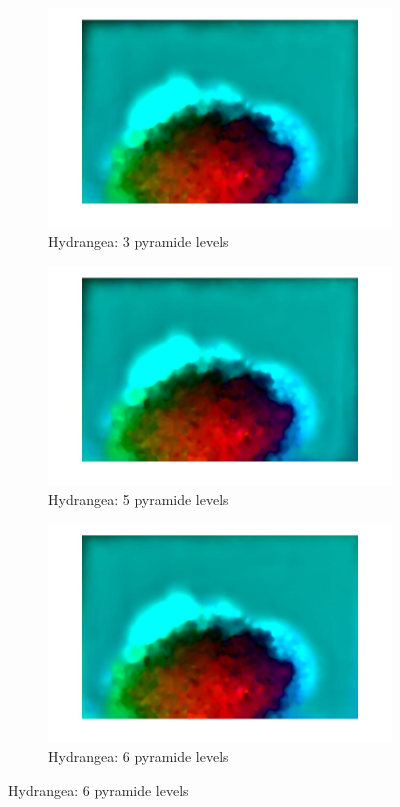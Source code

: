 \documentclass[10pt,twocolumn,letterpaper]{article}
\begin{document}
\begin{figure}
	\centering
	\begin{subfigure}[b]{0.3\textwidth}
		\includegraphics[width=\textwidth] {hydragea_3levels.jpg}
		\caption{Hydrangea: 3 pyramide levels}
		\label{fig:hydragea3}
	\end{subfigure}\hfill
	\begin{subfigure}[b]{0.3\textwidth}
		\includegraphics[width=\textwidth] {hydragea_5levels.jpg} 
		\caption{Hydrangea: 5 pyramide levels}
		\label{fig:hydrangea5}
	\end{subfigure}\hfill
	\begin{subfigure}[b]{0.3\textwidth}
		\includegraphics[width=\textwidth] {hydragea_6levels.jpg} 
		\caption{Hydrangea: 6 pyramide levels}
		\label{fig:hydrangea6}
	\end{subfigure}


\end{figure}
\end{document}
